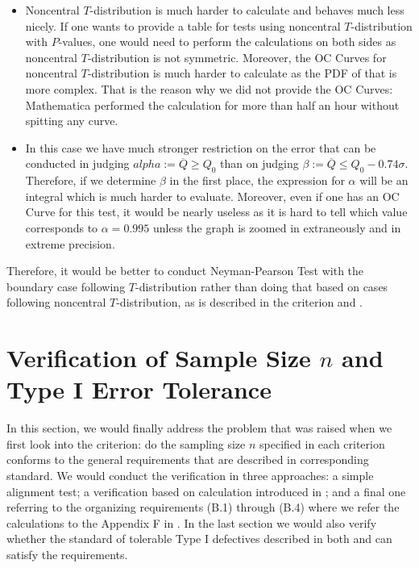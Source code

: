 \documentclass[12pt]{article}
\begin{document}
\begin{itemize}
    \item Noncentral $T$-distribution is much harder to calculate and behaves much less nicely. If one wants to provide a table for tests using noncentral $T$-distribution with $P$-values, one would need to perform the calculations on both sides as noncentral $T$-distribution is not symmetric. Moreover, the OC Curves for noncentral $T$-distribution is much harder to calculate as the PDF of that is more complex. That is the reason why we did not provide the OC Curves: Mathematica performed the calculation for more than half an hour without spitting any curve.
    \item In this case we have much stronger restriction on the error that can be conducted in judging $alpha := \overline{Q} \geq Q_0$ than on judging $\beta := \overline{Q} \leq Q_0 - 0.74\sigma$. Therefore, if we determine $\beta$ in the first place, the expression for $\alpha$ will be an integral which is much harder to evaluate. Moreover, even if one has an OC Curve for this test, it would be nearly useless as it is hard to tell which value corresponds to $\alpha = 0.995$ unless the graph is zoomed in extraneously and in extreme precision. 
\end{itemize}

Therefore, it would be better to conduct Neyman-Pearson Test with the boundary case following $T$-distribution rather than doing that based on cases following noncentral $T$-distribution, as is described in the criterion \cite{JJF2005} and \cite{OIML2016}.

\section{Verification of Sample Size $n$ and Type I Error Tolerance}

In this section, we would finally address the problem that was raised when we first look into the criterion: do the sampling size $n$ specified in each criterion conforms to the general requirements that are described in corresponding standard. We would conduct the verification in three approaches: a simple alignment test; a verification based on calculation introduced in \cite{OIML2016}; and a final one referring to the organizing requirements (B.1) through (B.4) where we refer the calculations to the Appendix F in \cite{OIML2016}. In the last section we would also verify whether the standard of tolerable Type I defectives described in both \cite{JJF2005} and \cite{OIML2016} can satisfy the requirements.
\end{document}
